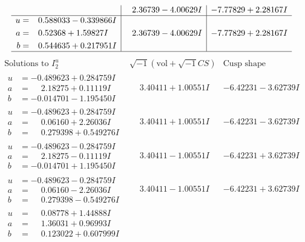 \documentclass[1p]{elsarticle_modified}
\theoremstyle{definition}
\newcommand{\I}{\sqrt{-1}}
\begin{document}
$$\begin{array}{c|c|c}
 & \phantom{-}2.36739 - 4.00629 I & -7.77829 + 2.28167 I \\ \hline\begin{aligned}
u &= \phantom{-}0.588033 - 0.339866 I \\
a &= \phantom{-}0.52368 + 1.59827 I \\
b &= \phantom{-}0.544635 + 0.217951 I\end{aligned}
 & \phantom{-}2.36739 - 4.00629 I & -7.77829 + 2.28167 I\\
 \hline 
 \end{array}$$\newpage$$\begin{array}{c|c|c}  
\text{Solutions to }I^u_{2}& \I (\text{vol} + \sqrt{-1}CS) & \text{Cusp shape}\\
 \hline 
\begin{aligned}
u &= -0.489623 + 0.284759 I \\
a &= \phantom{-}2.18275 + 0.11119 I \\
b &= -0.014701 - 1.195450 I\end{aligned}
 & \phantom{-}3.40411 + 1.00551 I & -6.42231 - 3.62739 I \\ \hline\begin{aligned}
u &= -0.489623 + 0.284759 I \\
a &= \phantom{-}0.06160 + 2.26036 I \\
b &= \phantom{-}0.279398 + 0.549276 I\end{aligned}
 & \phantom{-}3.40411 + 1.00551 I & -6.42231 - 3.62739 I \\ \hline\begin{aligned}
u &= -0.489623 - 0.284759 I \\
a &= \phantom{-}2.18275 - 0.11119 I \\
b &= -0.014701 + 1.195450 I\end{aligned}
 & \phantom{-}3.40411 - 1.00551 I & -6.42231 + 3.62739 I \\ \hline\begin{aligned}
u &= -0.489623 - 0.284759 I \\
a &= \phantom{-}0.06160 - 2.26036 I \\
b &= \phantom{-}0.279398 - 0.549276 I\end{aligned}
 & \phantom{-}3.40411 - 1.00551 I & -6.42231 + 3.62739 I \\ \hline\begin{aligned}
u &= \phantom{-}0.08778 + 1.44888 I \\
a &= \phantom{-}1.36031 + 0.96993 I \\
b &= \phantom{-}0.123022 + 0.607999 I\end{aligned}

\end{array}$$
\end{document}
